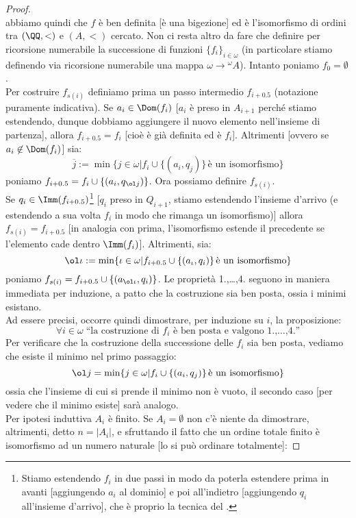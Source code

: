 \documentclass[11pt]{scrartcl}
\begin{document}
\begin{proof}
\[		\]
	abbiamo quindi che $f$ è ben definita [è una bigezione] ed è l'isomorfismo di ordini tra $(\QQ,<)$ e $(A,<)$ cercato. Non ci resta altro da fare che definire per ricorsione numerabile la successione di funzioni $\{f_i\}_{i \in \omega}$ (in particolare 
	stiamo definendo via ricorsione numerabile una mappa $\omega \rightarrow {}^{\omega}A$). Intanto poniamo $f_0 = \emptyset$.\\
	Per costruire $f_{s(i)}$ definiamo prima un passo intermedio $f_{i+0.5}$ (notazione puramente indicativa). Se $a_i \in \Dom(f_i)$ [$a_i$ è preso in $A_{i+1}$ perché stiamo estendendo, dunque dobbiamo aggiungere il nuovo elemento nell'insieme di partenza], allora $f_{i+0.5} = f_i$ [cioè è già definita ed è $f_i$]. Altrimenti [ovvero se $a_i \not \in \Dom(f_i)$] sia:
	\[ \overline{j} := \min\{j \in \omega | f_i \cup \{(a_i,q_j)\} \,\text{è un isomorfismo}\}
		\]
	poniamo $f_{i+0.5} = f_i \cup \{(a_i,q_{\ol j})\}$. Ora possiamo definire $f_{s(i)}$.\\
	Se $q_i \in \Imm(f_{i+0.5})$\footnote{Stiamo estendendo $f_i$ in due passi in modo da poterla estendere prima in avanti [aggiungendo $a_i$ al dominio] e poi all'indietro [aggiungendo $q_i$ all'insieme d'arrivo], che è proprio la tecnica del .} [$q_i$ preso in $Q_{i+1}$, stiamo estendendo l'insieme d'arrivo (e estendendo a sua volta $f_i$ in modo che rimanga un isomorfismo)] allora $f_{s(i)} = f_{i+0.5}$ [in analogia con prima, l'isomorfismo estende il precedente se l'elemento cade dentro $\Imm(f_i)$]. Altrimenti, sia:
	\[ \ol \iota := \min\{\iota \in \omega | f_{i+0.5} \cup \{(a_\iota,q_i)\}\,\text{è un isomorfismo}\}
		\]
	poniamo $f_{s(i)} = f_{i+0.5} \cup \{(a_{\ol \iota},q_i)\}$. Le proprietà 1.,\ldots,4. seguono in maniera immediata per induzione, a patto che la costruzione sia ben posta, ossia i minimi esistano.\\
	Ad essere precisi, occorre quindi dimostrare, per induzione su $i$, la proposizione:
	\[ \forall i \in \omega \; \text{``la costruzione di $f_i$ è ben posta e valgono 1.,\ldots,4.''}
		\]
	Per verificare che la costruzione della successione delle $f_i$ sia ben posta, vediamo che esiste il minimo nel primo passaggio:
	\[ \ol j = \min\{j \in \omega | f_i \cup \{(a_i,q_j)\}\,\text{è un isomorfismo}\}
		\]
	ossia che l'insieme di cui si prende il minimo non è vuoto, il secondo caso [per vedere che il minimo esiste] sarà analogo.\\
	Per ipotesi induttiva $A_i$ è finito. Se $A_i = \emptyset$ non c'è niente da dimostrare, altrimenti, 
	detto $n = |A_i|$, e sfruttando il fatto che un ordine totale finito è isomorfismo ad un numero naturale [lo si può ordinare totalmente]:

\end{proof}
\end{document}
